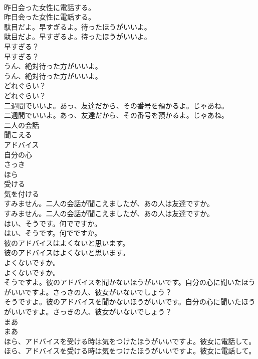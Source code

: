 \documentclass[8pt]{extreport}
\begin{document}
\begin{CJK}{UTF8}{min}
\\	昨日会った女性に電話する。	
\\	昨日会った女性に電話する。 
\\	駄目だよ。早すぎるよ。待ったほうがいいよ。	
\\	駄目だよ。早すぎるよ。待ったほうがいいよ。 
\\	早すぎる？	
\\	早すぎる？ 
\\	うん、絶対待った方がいいよ。	
\\	うん、絶対待った方がいいよ。 
\\	どれぐらい？	
\\	どれぐらい？ 
\\	二週間でいいよ。あっ、友達だから、その番号を預かるよ。じゃあね。	
\\	二週間でいいよ。あっ、友達だから、その番号を預かるよ。じゃあね。 
\\	二人の会話
\\	聞こえる
\\	アドバイス
\\	自分の心
\\	さっき
\\	ほら
\\	受ける
\\	気を付ける
\\	すみません。二人の会話が聞こえましたが、あの人は友達ですか。	
\\	すみません。二人の会話が聞こえましたが、あの人は友達ですか。 
\\	はい、そうです。何でですか。	
\\	はい、そうです。何でですか。 
\\	彼のアドバイスはよくないと思います。	
\\	彼のアドバイスはよくないと思います。 
\\	よくないですか。	
\\	よくないですか。 
\\	そうですよ。彼のアドバイスを聞かないほうがいいです。自分の心に聞いたほうがいいですよ。さっきの人、彼女がいないでしょう？	
\\	そうですよ。彼のアドバイスを聞かないほうがいいです。自分の心に聞いたほうがいいですよ。さっきの人、彼女がいないでしょう？ 
\\	まあ
\\	まあ
\\	ほら、アドバイスを受ける時は気をつけたほうがいいですよ。彼女に電話して。	
\\	ほら、アドバイスを受ける時は気をつけたほうがいいですよ。彼女に電話して。 

\end{CJK}
\end{document}
